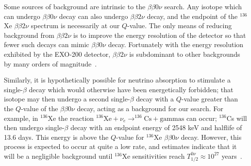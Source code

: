 Some sources of background are intrinsic to the $\beta\beta 0\nu$ search.  Any isotope which can undergo $\beta\beta 0\nu$ decay can also undergo $\beta\beta 2\nu$ decay, and the endpoint of the $^{136}$Xe $\beta\beta 2\nu$ spectrum is necessarily at our $Q$-value.  The only means of reducing background from $\beta\beta 2\nu$ is to improve the energy resolution of the detector so that fewer such decays can mimic $\beta\beta 0\nu$ decay.  Fortunately with the energy resolution exhibited by the EXO-200 detector, $\beta\beta 2\nu$ is subdominant to other backgrounds by many orders of magnitude~\cite{NewEXObb0nPaper_2014}.

Similarly, it is hypothetically possible for neutrino absorption to stimulate a single-$\beta$ decay which would otherwise have been energetically forbidden; that isotope may then undergo a second single-$\beta$ decay with a $Q$-value greater than the $Q$-value of the $\beta\beta 0\nu$ decay, acting as a background for our search.  For example, in $^{136}$Xe the reaction $^{136}\mathrm{Xe} + \nu_e \rightarrow ^{136}\mathrm{Cs} + \mathrm{gammas}$ can occur; $^{136}$Cs will then undergo single-$\beta$ decay with an endpoint energy of 2548 keV and halflife of 13.6 days.  This energy is above the $Q$-value for $^{136}$Xe $\beta\beta 0\nu$ decay.  However, this process is expected to occur at quite a low rate, and estimates indicate that it will be a negligible background until $^{136}$Xe sensitivities reach $T_{1/2}^{0\nu} \approx 10^{27}$ years~\cite{0954-3899-30-9-R01,1309.7957}.

